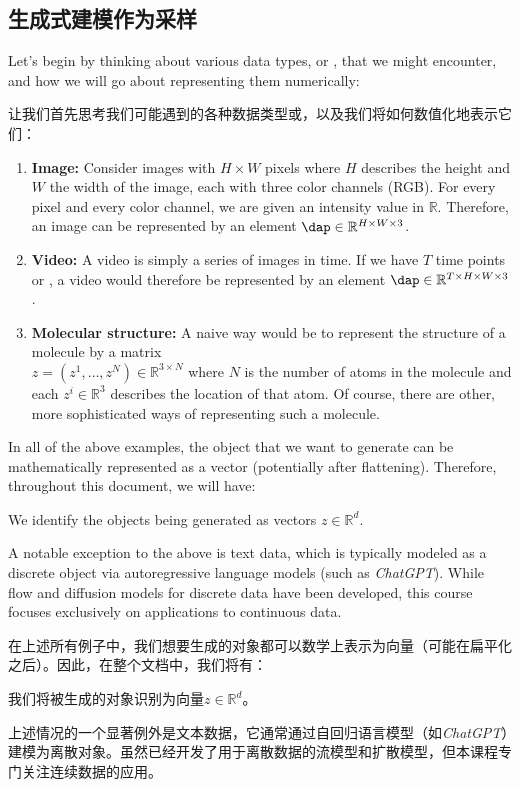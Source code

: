 \subsection{生成式建模作为采样}

Let's begin by thinking about various data types, or , that we might encounter, and how we will go about representing them numerically:

让我们首先思考我们可能遇到的各种数据类型或，以及我们将如何数值化地表示它们：
\begin{enumerate}
    \item \textbf{\sffamily Image: }Consider images with $H \times W$ pixels where $H$ describes the height and $W$ the width of the image, each with three color channels (RGB). For every pixel and every color channel, we are given an intensity value in $\mathbb{R}$. Therefore, an image can be represented by an element $\dap\in\mathbb{R}^{H \times W \times 3}$.
    \item \textbf{\sffamily Video: }A video is simply a series of images in time. If we have $T$ time points or , a video would therefore be represented by an element $\dap\in\mathbb{R}^{T\times H \times W \times 3}$.
    \item \textbf{\sffamily Molecular structure: }A naive way would be to represent the structure of a molecule by a matrix \\$z=(z^1,\dots,z^N)\in\mathbb{R}^{3\times N}$ where $N$ is the number of atoms in the molecule and each $z^i\in\mathbb{R}^3$ describes the location of that atom. Of course, there are other, more sophisticated ways of representing such a molecule.
\end{enumerate}
In all of the above examples, the object that we want to generate can be mathematically represented as a vector (potentially after flattening). Therefore, throughout this document, we will have:
\begin{ideabox}
    We identify the objects being generated as vectors $z \in \mathbb{R}^d$.
\end{ideabox}
A notable exception to the above is text data, which is typically modeled as a discrete object via autoregressive language models (such as \emph{ChatGPT}). While flow and diffusion models for discrete data have been developed, this course focuses exclusively on applications to continuous data.

在上述所有例子中，我们想要生成的对象都可以数学上表示为向量（可能在扁平化之后）。因此，在整个文档中，我们将有：
\begin{ideabox}[对象作为向量]
    我们将被生成的对象识别为向量$z \in \mathbb{R}^d$。
\end{ideabox}
上述情况的一个显著例外是文本数据，它通常通过自回归语言模型（如\emph{ChatGPT}）建模为离散对象。虽然已经开发了用于离散数据的流模型和扩散模型，但本课程专门关注连续数据的应用。


